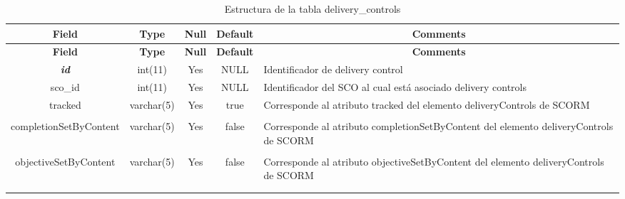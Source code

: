 %
%
\begin{longtable}{c c c c l}
	\multicolumn{1}{c}{\textbf{Field}} &
	\multicolumn{1}{c}{\textbf{Type}} &
	\multicolumn{1}{c}{\textbf{Null}} &
	\multicolumn{1}{c}{\textbf{Default}} &
	\multicolumn{1}{c}{\textbf{Comments}} \\ \hline \hline
\endfirsthead
	\multicolumn{1}{c}{\textbf{Field}} &
	\multicolumn{1}{c}{\textbf{Type}} &
	\multicolumn{1}{c}{\textbf{Null}} &
	\multicolumn{1}{c}{\textbf{Default}} &
	\multicolumn{1}{c}{\textbf{Comments}} \\ \hline \hline
\endhead \endfoot
	\textbf{\textit{id}} & int(11) & Yes & NULL & \parbox[t]{0.35\textwidth}{Identificador de delivery control}\\ \hline 
	sco\_id & int(11) & Yes & NULL & \parbox[t]{0.35\textwidth}{Identificador del SCO al cual está asociado delivery controls}\\ \hline 
	tracked & varchar(5) & Yes & true & \parbox[t]{0.35\textwidth}{Corresponde al atributo tracked del elemento deliveryControls de SCORM} \\ \\  \hline
	completionSetByContent & varchar(5) & Yes & false & \parbox[t]{0.35\textwidth}{Corresponde al atributo completionSetByContent del elemento deliveryControls de SCORM} \\ \\  \hline
	objectiveSetByContent & varchar(5) & Yes & false & \parbox[t]{0.35\textwidth}{Corresponde al atributo objectiveSetByContent  del elemento deliveryControls de SCORM} \\ \\  \hline
 \caption{Estructura de la tabla delivery\_controls} \label{tab:scorm_delivery_controls-structure} \\
\end{longtable}

